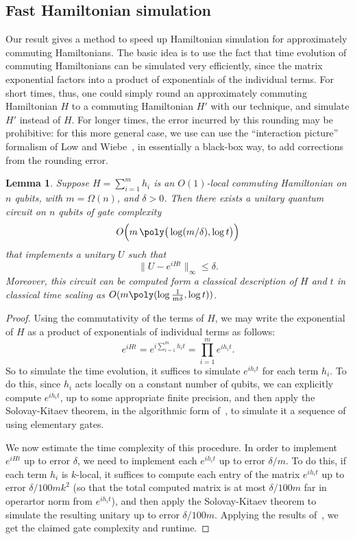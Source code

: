\documentclass[11pt]{article}
\theoremstyle{plain}
\newtheorem{lemma}[theorem]{Lemma}
\begin{document}
\subsection{Fast Hamiltonian simulation}\label{sec:hamiltonian-simulation}
Our result gives a method to speed up Hamiltonian simulation for approximately commuting Hamiltonians. The basic idea is to use the fact that time evolution of commuting Hamiltonians can be simulated very efficiently, since the matrix exponential factors into a product of exponentials of the individual terms. For short times, thus, one could simply round an approximately commuting Hamiltonian $H$ to a commuting Hamiltonian $H'$ with our technique, and simulate $H'$ instead of $H$. For longer times, the error incurred by this rounding may be prohibitive: for this more general case, we use can use the ``interaction picture'' formalism of Low and Wiebe~\cite{low2018hamiltonian}, in essentially a black-box way, to add corrections from the rounding error. 
\begin{lemma}\label{lem:com-ham-fast}
    Suppose $H = \sum_{i=1}^{m} h_i$ is an $O(1)$-local commuting Hamiltonian on $n$ qubits, with $m = \Omega(n)$, and $\delta > 0$. Then there exists a unitary quantum circuit on $n$ qubits of gate complexity 
     \[ O\Big(m \, \poly\big(\log(m/\delta), \log t\big)\Big)\]
     that implements a unitary $U$ such that
     \[ \|U - e^{iHt} \|_\infty \leq \delta. \] 
     Moreover, this circuit can be computed form a classical description of $H$ and $t$ in classical time scaling as $O(m \poly(\log\frac{1}{m\delta}, \log t))$.
\end{lemma}
\begin{proof}
   Using the commutativity of the terms of $H$, we may write the exponential of $H$ as a product of exponentials of individual terms as follows:
    \[ e^{iHt} = e^{i\sum_{i=1}^{m} h_i t} = \prod_{i=1}^{m} e^{i h_i t}. \]
    So to simulate the time evolution, it suffices to simulate $e^{i h_i t}$ for each term $h_i$.
    To do this, since $h_i$ acts locally on a constant number of qubits, we can explicitly compute $e^{ih_i t}$, up to some appropriate finite precision, and then apply the Solovay-Kitaev theorem, in the algorithmic form of~\cite{dawson2006solovay}, to simulate it a sequence of using elementary gates.
    
    We now estimate the time complexity of this procedure. In order to implement $e^{iHt}$ up to error $\delta$, we need to implement each $e^{i h_i t}$ up to error $\delta/m$. To do this, if each term $h_i$ is $k$-local, it suffices to compute each entry of the matrix $e^{i h_i t}$ up to error $\delta/100mk^2$ (so that the total computed matrix is at most $\delta/100m$ far in operartor norm from $e^{ih_i t}$), and then apply the Solovay-Kitaev theorem to simulate the resulting unitary up to error $\delta/100m$. Applying the results of~\cite{dawson2006solovay}, we get the claimed gate complexity and runtime.
\end{proof}
\end{document}
